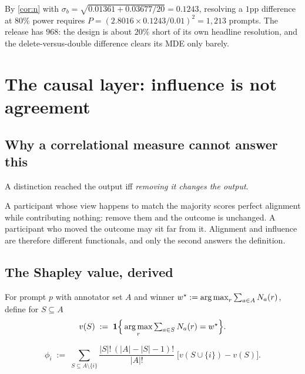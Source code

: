 \begin{corollary}
By \cref{cor:n} with $\sigma_b = \sqrt{0.01361 + 0.03677/20} = 0.1243$, resolving
a $1$pp difference at $80\%$ power requires
$P = (2.8016 \times 0.1243/0.01)^2 = 1{,}213$ prompts. The release has $968$: the
design is about $20\%$ short of its own headline resolution, and the
delete-versus-double difference clears its MDE only barely.
\end{corollary}

\section{The causal layer: influence is not agreement}
\label{sec:c1}

\subsection{Why a correlational measure cannot answer this}

\begin{definition}
A distinction reached the output iff \emph{removing it changes the output}.
\end{definition}

A participant whose view happens to match the majority scores perfect alignment
while contributing nothing: remove them and the outcome is unchanged. A
participant who moved the outcome may sit far from it. Alignment and influence
are therefore different functionals, and only the second answers the definition.

\subsection{The Shapley value, derived}

\begin{definition}
For prompt $p$ with annotator set $A$ and winner
$w^\star := \operatorname*{arg\,max}_r \sum_{a\in A}N_a(r)$, define for $S \subseteq A$
\[
v(S) \;:=\; \mathbf{1}\Big\{\operatorname*{arg\,max}_r \textstyle\sum_{a\in S}N_a(r) = w^\star\Big\}.
\]
\end{definition}

\begin{definition}
\[
\phi_i \;:=\; \sum_{S \subseteq A\setminus\{i\}}
\frac{|S|!\,(|A|-|S|-1)!}{|A|!}\;\big[v(S\cup\{i\})-v(S)\big].
\]
\end{definition}

